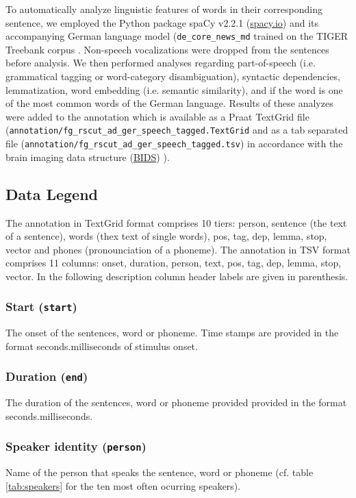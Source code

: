 \documentclass[10pt,a4paper,onecolumn]{article}
\begin{document}
To automatically analyze linguistic features of words in their corresponding
sentence, we employed the Python package spaCy v2.2.1
(\href{https://spacy.io}{spacy.io}) and its accompanying German language model
(\texttt{de\_core\_news\_md} trained on the TIGER Treebank corpus \citep{brants2004tiger}.
Non-speech vocalizations were dropped from the sentences before analysis.
We then performed analyses regarding part-of-speech (i.e. grammatical tagging or word-category disambiguation), syntactic dependencies, lemmatization, word embedding (i.e. semantic similarity), and if the word is one of the most common words of the German language.
Results of these analyzes were added to the annotation which is available as a Praat TextGrid file (\texttt{annotation/fg\_rscut\_ad\_ger\_speech\_tagged.TextGrid} and as a tab separated file (\texttt{annotation/fg\_rscut\_ad\_ger\_speech\_tagged.tsv}) in accordance with the brain imaging data structure (\href{https://bids.neuroimaging.io/}{BIDS}) \citep{gorgolewski2016bids}).


\subsection*{Data Legend}
The annotation in TextGrid format comprises 10 tiers: person, sentence (the text of a sentence), words (thex text of single words), pos, tag, dep, lemma, stop, vector and phones (pronounciation of a phoneme).
The annotation in TSV format comprises 11 columns: onset, duration, person, text, pos, tag, dep, lemma, stop, vector.
In the following description column header labels are given in parenthesis.


\subsubsection*{Start (\texttt{start})}
The onset of the sentences, word or phoneme. Time stamps are provided in the format seconds.milliseconds of stimulus onset.


\subsubsection*{Duration (\texttt{end})}
The duration of the sentences, word or phoneme provided provided in the format seconds.milliseconds.


\subsubsection*{Speaker identity (\texttt{person})}
Name of the person that speaks the sentence, word or phoneme (cf. table \ref{tab:speakers} for the ten most often ocurring speakers).
\end{document}
